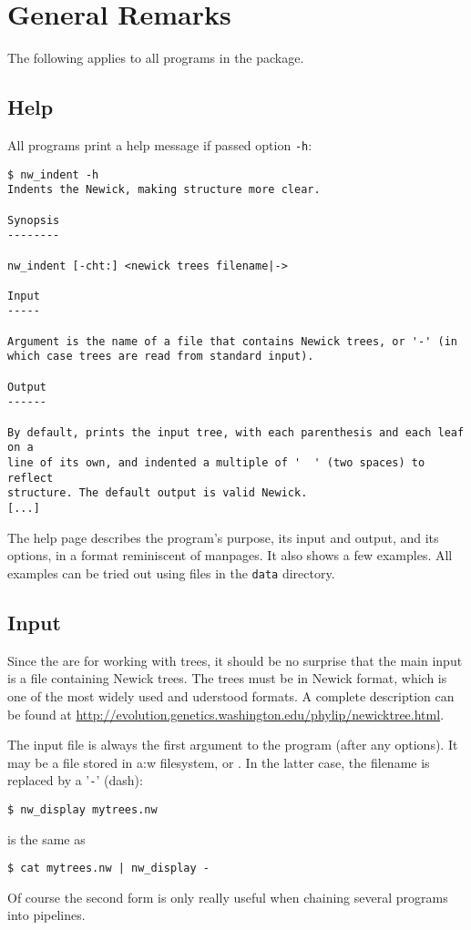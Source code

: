 
\chapter{General Remarks}
\label{chap_general}

The following applies to all programs in the \nutils{} package.

\section{Help}
\label{sct_help}

All programs print a help message if passed option \texttt{-h}:

\begin{samepage}
\begin{verbatim}
$ nw_indent -h
Indents the Newick, making structure more clear.

Synopsis
--------

nw_indent [-cht:] <newick trees filename|->

Input
-----

Argument is the name of a file that contains Newick trees, or '-' (in
which case trees are read from standard input).

Output
------

By default, prints the input tree, with each parenthesis and each leaf on a
line of its own, and indented a multiple of '  ' (two spaces) to reflect
structure. The default output is valid Newick.
[...]
\end{verbatim}
\end{samepage}
The help page describes the program's purpose, its input and output, and its
options, in a format reminiscent of \unix{} manpages. It also shows a few
examples. All examples can be tried out using files in the \texttt{data}
directory.

\section{Input}
\label{sct_input}

Since the \nutils{} are for working with trees, it should be no surprise
that the main input is a file containing Newick trees. The trees must be in
Newick format, which is one of the most widely used and uderstood formats. A
complete description can be found at
\url{http://evolution.genetics.washington.edu/phylip/newicktree.html}.

The input file is always the first argument to the program (after any options).
It may be a file stored in a:w filesystem, or \stdin{}. In the latter case, the
filename is replaced by a '\texttt{-}' (dash):
\begin{samepage}
\begin{verbatim}
$ nw_display mytrees.nw
\end{verbatim}
is the same as
\begin{verbatim}
$ cat mytrees.nw | nw_display -
\end{verbatim}
\end{samepage}
Of course the second form is only really useful when chaining several programs into pipelines.

